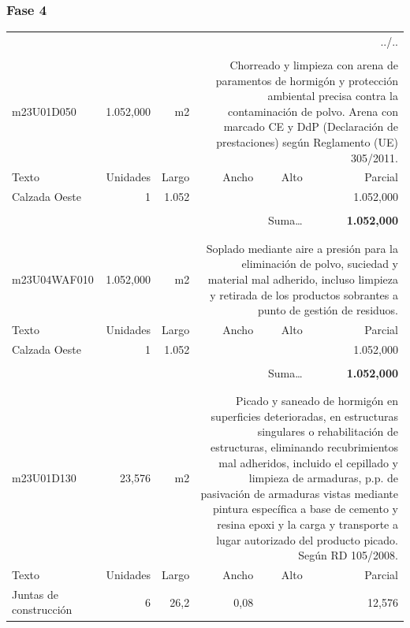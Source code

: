 \documentclass{book}%
\begin{document}
\subsubsection{Fase 4}%
\begin{longtable}{lrrrrr}%
\multicolumn{6}{r}{../..}\\%
\endfoot%
\endlastfoot%
&&&&&\\%
m23U01D050& 1.052,000& m2&\multicolumn{3}{p{6cm}}{\scriptsize Chorreado y limpieza con arena de paramentos de hormigón y protección ambiental precisa contra la contaminación de polvo. Arena con marcado CE y DdP (Declaración de prestaciones) según Reglamento (UE) 305/2011.\normalsize}\\%
Texto&Unidades&Largo&Ancho&Alto&Parcial\\%
\hline%
\multicolumn{1}{p{3.5cm}}{Calzada Oeste}&1&1.052&&& 1.052,000\\%
&&&&&\\%
\multicolumn{5}{r}{Suma\ldots}&\textbf{ 1.052,000}\\%
\hline%
&&&&&\\%
&&&&&\\%
m23U04WAF010& 1.052,000& m2&\multicolumn{3}{p{6cm}}{\scriptsize Soplado mediante aire a presión para la eliminación de polvo, suciedad y material mal adherido, incluso limpieza y retirada de los productos sobrantes a punto de gestión de residuos.\normalsize}\\%
Texto&Unidades&Largo&Ancho&Alto&Parcial\\%
\hline%
\multicolumn{1}{p{3.5cm}}{Calzada Oeste}&1&1.052&&& 1.052,000\\%
&&&&&\\%
\multicolumn{5}{r}{Suma\ldots}&\textbf{ 1.052,000}\\%
\hline%
&&&&&\\%
&&&&&\\%
m23U01D130&    23,576& m2&\multicolumn{3}{p{6cm}}{\scriptsize Picado y saneado de hormigón en superficies deterioradas, en estructuras singulares o rehabilitación de estructuras, eliminando recubrimientos mal adheridos, incluido el cepillado y limpieza de armaduras, p.p. de pasivación de armaduras vistas mediante pintura específica a base de cemento y resina epoxi y la carga y transporte a lugar autorizado del producto picado. Según RD 105/2008.\normalsize}\\%
Texto&Unidades&Largo&Ancho&Alto&Parcial\\%
\hline%
\multicolumn{1}{p{3.5cm}}{Juntas de construcción}&6&26,2&0,08&&    12,576\\%

\end{longtable}
\end{document}
